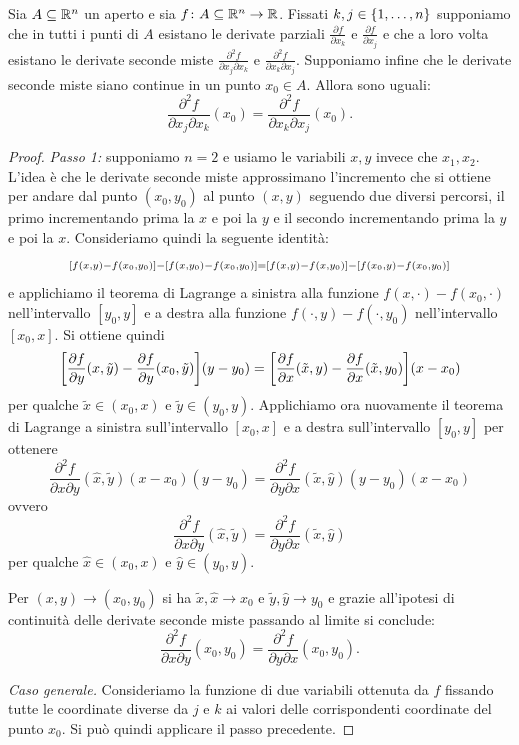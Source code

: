\begin{theorem}[Schwarz]
Sia $A\subseteq {\mathbb R}^n$ un aperto 
e sia $f\colon A \subseteq {\mathbb R}^n \to {\mathbb R}$.
Fissati $k,j\in {\left\{ 1,\dots,n \right\}}$
supponiamo che in tutti i punti di $A$ esistano le derivate parziali 
$\frac{\partial f}{\partial x_k}$ 
e $\frac{\partial f}{\partial x_j}$
e che a loro volta esistano le derivate seconde miste 
$\frac{\partial^2 f}{\partial x_j \partial x_k}$
e $\frac{\partial^2 f}{\partial x_k \partial x_j}$.
Supponiamo infine che le derivate seconde miste siano continue 
in un punto $ x_0\in A$. Allora sono uguali:
\[
 \frac{\partial^2 f}{\partial x_j \partial x_k}( x_0)
 = \frac{\partial^2 f}{\partial x_k \partial x_j}( x_0).
\]
\end{theorem}
%
\begin{proof}
  \emph{Passo 1:} supponiamo $n=2$ e usiamo le variabili $x,y$ invece che 
  $x_1,x_2$. 
L'idea è che le derivate seconde miste approssimano l'incremento che si ottiene 
per andare dal punto $(x_0,y_0)$ al punto $(x,y)$ seguendo due diversi percorsi,
il primo incrementando prima la $x$ e poi la $y$ e il secondo 
incrementando prima la $y$ e poi la $x$.
Consideriamo quindi la seguente identità:
\[
\scriptstyle
{\left[ f(x,y)-f(x_0,y_0) \right]} - {\left[ f(x,y_0) - f(x_0,y_0) \right]}
= {\left[ f(x,y) - f(x,y_0) \right]} - {\left[ f(x_0,y) - f(x_0, y_0) \right]}
\]
e applichiamo il teorema di Lagrange 
a sinistra alla funzione $f(x,\cdot) - f(x_0,\cdot)$ nell'intervallo $[y_0,y]$ 
e a destra alla funzione $f(\cdot,y) - f(\cdot,y_0)$ nell'intervallo $[x_0,x]$.
Si ottiene quindi
\[
{\left[ \frac{\partial f}{\partial y}(x,\tilde y)-\frac{\partial f}{\partial y}(x_0,\tilde y) \right]}(y-y_0)
= {\left[ \frac{\partial f}{\partial x}(\tilde x,y)-\frac{\partial f}{\partial x}(\tilde x,y_0) \right]}(x-x_0)
\]
per qualche $\tilde x \in (x_0,x)$ e $\tilde y \in (y_0,y)$.
Applichiamo ora nuovamente il teorema di Lagrange a sinistra
sull'intervallo $[x_0,x]$ e a destra sull'intervallo $[y_0,y]$ 
per ottenere
\[
\frac{\partial^2 f}{\partial x\partial y}(\hat x,\tilde y)(x-x_0)(y-y_0)
= \frac{\partial^2 f}{\partial y\partial x}(\tilde x,\hat y)(y-y_0)(x-x_0)
\]
ovvero
\[
\frac{\partial^2 f}{\partial x\partial y}(\hat x,\tilde y)
= \frac{\partial^2 f}{\partial y\partial x}(\tilde x,\hat y)
\]
per qualche $\hat x \in (x_0,x)$ e $\hat y \in (y_0,y)$.

Per $(x,y)\to(x_0,y_0)$ si ha $\tilde x, \hat x \to x_0$ e $\tilde y, \hat y\to y_0$
e grazie all'ipotesi di continuità delle derivate seconde miste 
passando al limite si conclude:
\[
\frac{\partial^2 f}{\partial x\partial y}(x_0, y_0)
= \frac{\partial^2 f}{\partial y\partial x}(x_0, y_0).  
\]

\emph{Caso generale.}
Consideriamo la funzione di due variabili ottenuta da $f$ fissando 
tutte le coordinate diverse da $j$ e $k$ ai valori delle corrispondenti 
coordinate del punto $ x_0$. 
Si può quindi applicare il passo precedente.
\end{proof}

